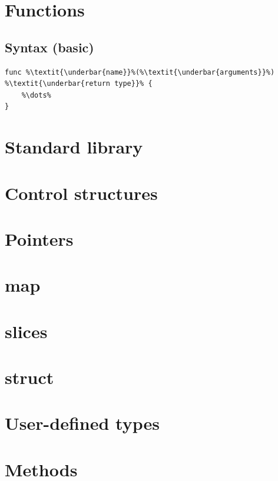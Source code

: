 \documentclass{article}
\begin{document}
\begin{multicols*}{3}
  \filbreak
  \section*{Functions}

  \subsection*{Syntax (basic)}

  \begin{lstlisting}[numbers=none,escapechar=\%]
func %\textit{\underbar{name}}%(%\textit{\underbar{arguments}}%) %\textit{\underbar{return type}}% {
    %\dots%
}
\end{lstlisting}

  \filbreak
  \section*{Standard library}

  \filbreak
  \section*{Control structures}

  \filbreak
  \section*{Pointers}

  \filbreak
  \section*{map}

  \filbreak
  \section*{slices}

  \filbreak
  \section*{struct}

  \filbreak
  \section*{User-defined types}

  \filbreak
  \section*{Methods}


\end{multicols*}
\end{document}
